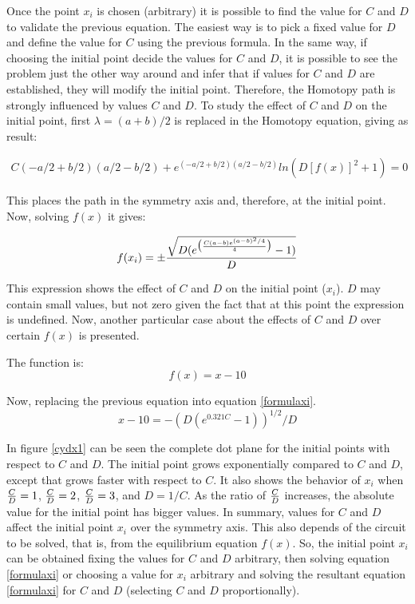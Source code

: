 \documentclass[conference,letterpaper,onecolumn]{IEEEtran}
\begin{document}
\begin{itemize}
Once the point $x_i$ is chosen (arbitrary) it is possible to find the value for $C$ and $D$ to validate the previous equation. The easiest way is to pick a fixed value for $D$ and define the value for $C$ using the previous formula. In the same way, if choosing the initial point decide the values for $C$ and $D$, it is possible to see the problem just the other way around and infer that if values for $C$ and $D$ are established, they will modify the initial point. Therefore, the Homotopy path is strongly influenced by values $C$ and $D$. To study the effect of $C$ and $D$ on the initial point, first $\lambda=(a+b)/2$ is replaced in the Homotopy equation, giving as result:

\begin{displaymath}
\begin{array}{c}
C(-a/2+b/2)(a/2-b/2)+e^{(-a/2+b/2)(a/2-b/2)}ln(D[f(x)]^2+1)=0
\end{array}
\end{displaymath}

This places the path in the symmetry axis and, therefore, at the initial point. Now, solving $f(x)$ it gives:

\begin{equation}
f(x_i)=\pm {{\sqrt{ D(e^{\big ( {{C(a-b)e^{(a-b)^2/4} }  \over { 4   }} \big ) }-1 )}} \over {D}}
\label{formulaxi}
\end{equation}

This expression shows the effect of $C$ and $D$ on the initial point ($x_i$). $D$ may contain small values, but not zero given the fact that at this point the expression is undefined. Now, another particular case about the effects of $C$ and $D$ over certain $f(x)$ is presented.

The function is:
\begin{displaymath}
f(x)=x-10
\end{displaymath}

Now, replacing the previous equation into equation \ref{formulaxi}.
\begin{displaymath}
x-10=-(D(e^{0.321C}-1))^{1/2}/D
\end{displaymath}

In figure \ref{cydx1} can be seen the complete dot plane for the initial points with respect to $C$ and $D$. The initial point grows exponentially compared to $C$ and $D$, except that grows faster with respect to $C$. It also shows the behavior of $x_i$ when ${C \over D}=1$, ${C \over D}=2$, ${C \over D}=3$, and $D=1/C$. As the ratio of $C \over D$ increases, the absolute value for the initial point has bigger values. In summary, values for $C$ and $D$ affect the initial point $x_i$ over the symmetry axis. This also depends of the circuit to be solved, that is, from the equilibrium equation $f(x)$. So, the initial point $x_i$ can be obtained fixing the values for $C$ and $D$ arbitrary, then solving equation \ref{formulaxi} or choosing a value for $x_i$ arbitrary and solving the resultant equation \ref{formulaxi} for $C$ and $D$ (selecting $C$ and $D$ proportionally).


\end{itemize}
\end{document}
